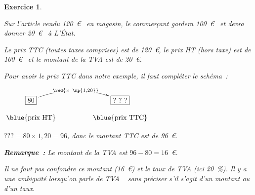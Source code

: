 \documentclass[10pt]{article}
\newtheorem{exo}{Exercice}
\begin{document}
\begin{exo}
\begin{enumerate}
Sur l'article vendu 120~\euro~{} en magasin, le commerçant gardera 100~\euro~{} et devra donner 20~\euro~{} à L’État.

Le prix TTC (toutes taxes comprises) est de 120~\euro, le prix HT (hors taxe) est de 100~\euro~{} et le montant de la TVA est de 20~\euro.

\medskip

Pour avoir le prix TTC dans notre exemple, il faut compléter le schéma~:



\begin{center}
$\xymatrix@R=0.5pc@C=4pc{
    *+[F]+\txt{80} \ar@/^0.5cm/[r]|{\red{\times ~\np{1,20}}} & 
    *+[F]+\txt{?~?~?}  \\
    \txt{\blue{prix HT}}&
    \txt{\blue{prix TTC}}}$
    
    \end{center}
    
    \medskip
    
 $???=80\times 1,20=96$, donc le montant TTC est de 96~\euro.
 
 \medskip
 
 \textbf{Remarque~:} Le montant de la TVA est $96-80=16$~\euro.
 
 Il ne faut pas confondre ce montant (16~\euro) et le taux de TVA (ici 20~\%). Il y a une ambiguïté lorsqu'on parle de \og TVA \fg~{} sans préciser s'il s'agit d'un montant ou d'un taux.
\end{enumerate}


\end{exo}
\end{document}
